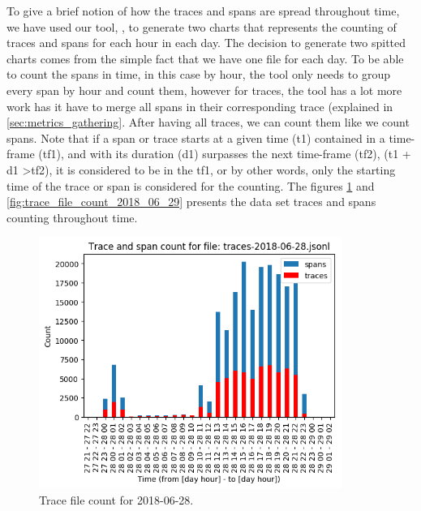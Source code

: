 To give a brief notion of how the traces and spans are spread throughout time, we have used our tool, , to generate two charts that represents the counting of traces and spans for each hour in each day. The decision to generate two spitted charts comes from the simple fact that we have one file for each day. To be able to count the spans in time, in this case by hour, the tool only needs to group every span by hour and count them, however for traces, the tool has a lot more work has it have to merge all spans in their corresponding trace (explained in \ref{sec:metrics_gathering}. After having all traces, we can count them like we count spans. Note that if a span or trace starts at a given time (t1) contained in a time-frame (tf1), and with its duration (d1) surpasses the next time-frame (tf2), (t1 + d1 \textgreater tf2), it is considered to be in the tf1, or by other words, only the starting time of the trace or span is considered for the counting. The figures \ref{fig:trace_file_count_2018_06_28} and \ref{fig:trace_file_count_2018_06_29} presents the data set traces and spans counting throughout time.

\begin{figure}[H]
    \centering
    \includegraphics[width=0.88\textwidth]{images/trace_file_count_2018_06_28_chart.png}
    \caption{Trace file count for 2018-06-28.}
    \label{fig:trace_file_count_2018_06_28}
\end{figure}

